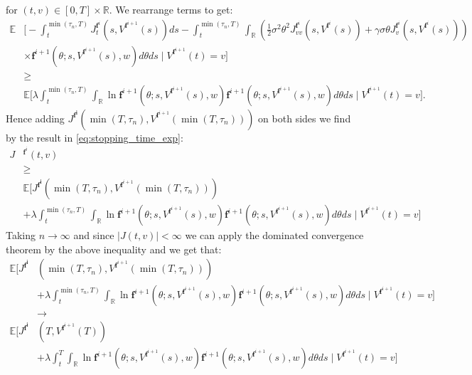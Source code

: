 \documentclass[oneside, a4paper, onecolumn, 11pt]{article}
\begin{document}
for $(t,v) \in [0,T] \times \mathbb{R}$. We rearrange terms to get: 
\begin{align*}
      \mathbb{E}&\Bigg[-\int_{t}^{\min(\tau_n,T)} J_t^{\boldsymbol{f}^i}(s,V^{\boldsymbol{f}^{i+1}}(s))ds 
      -\int_{t}^{\min(\tau_n,T)}\int_{\mathbb{R}}\left(\frac{1}{2} \sigma^2 \theta^2 J^{\boldsymbol{f}^i}_{vv}(s, V^{\boldsymbol{f}^{i}}(s)) + \gamma\sigma\theta J^{\boldsymbol{f}^i}_v(s, V^{\boldsymbol{f}^{i}}(s)) \right)\\&\times\boldsymbol{f}^{i+1}(\theta;s,V^{\boldsymbol{f}^{i+1}}(s),w)d\theta ds \mid V^{\boldsymbol{f}^{i+1}}(t)=v \Bigg]\\ &\geq\\
  &\mathbb{E}\Bigg[\lambda \int_{t}^{\min(\tau_n,T)}\int_{\mathbb{R}}\ln{\boldsymbol{f}^{i+1}(\theta;s,V^{\boldsymbol{f}^{i+1}}(s),w)}\boldsymbol{f}^{i+1}(\theta;s,V^{\boldsymbol{f}^{i+1}}(s),w)d\theta ds \mid V^{\boldsymbol{f}^{i+1}}(t)=v\Bigg].
\end{align*}
Hence adding $J^{\boldsymbol{f^i}}\left(\min(T,\tau_n), V^{\boldsymbol{f}^{i+1}}(\min(T,\tau_n))\right)$ on both sides we find by the result in \eqref{eq:stopping_time_exp}: 
\begin{equation} 
\begin{aligned} 
    J&^{\boldsymbol{f}^i}(t,v)\\ &\geq \\
    &\mathbb{E}\Bigg[  J^{\boldsymbol{f^i}}\left(\min(T,\tau_n), V^{\boldsymbol{f}^{i+1}}(\min(T,\tau_n))\right) \\&+ \lambda \int_{t}^{\min(\tau_n,T)}\int_{\mathbb{R}}\ln{\boldsymbol{f}^{i+1}(\theta;s,V^{\boldsymbol{f}^{i+1}}(s),w)}\boldsymbol{f}^{i+1}(\theta;s,V^{\boldsymbol{f}^{i+1}}(s),w)d\theta ds \mid V^{\boldsymbol{f}^{i+1}}(t)=v\Bigg]
\end{aligned}
\end{equation}
Taking $n \to \infty$ and since $|J(t,v)|< \infty$  we can apply the dominated convergence theorem by the above inequality and we get that:
\begin{align*}
\mathbb{E}\Bigg[ J^{\boldsymbol{f^i}}&\left(\min(T,\tau_n), V^{\boldsymbol{f}^{i+1}}(\min(T,\tau_n))\right) \\&+ \lambda \int_{t}^{\min(\tau_n,T)}\int_{\mathbb{R}}\ln{\boldsymbol{f}^{i+1}(\theta;s,V^{\boldsymbol{f}^{i+1}}(s),w)}\boldsymbol{f}^{i+1}(\theta;s,V^{\boldsymbol{f}^{i+1}}(s),w)d\theta ds \mid V^{\boldsymbol{f}^{i+1}}(t)=v\Bigg]\\
&\to\\
\mathbb{E}\Bigg[ J^{\boldsymbol{f^i}}&\left(T, V^{\boldsymbol{f}^{i+1}}(T)\right) \\&+ \lambda \int_{t}^{T}\int_{\mathbb{R}}\ln{\boldsymbol{f}^{i+1}(\theta;s,V^{\boldsymbol{f}^{i+1}}(s),w)}\boldsymbol{f}^{i+1}(\theta;s,V^{\boldsymbol{f}^{i+1}}(s),w)d\theta ds \mid V^{\boldsymbol{f}^{i+1}}(t)=v\Bigg]
\end{align*}
\end{document}
